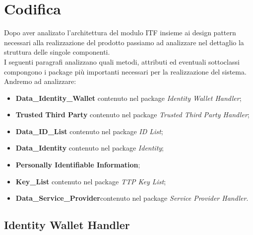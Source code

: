 
\chapter{Codifica}
\label{cap:codifica}
Dopo aver analizato l'architettura del modulo \gls{ITF} insieme ai design pattern necessari alla realizzazione del prodotto passiamo ad analizzare nel dettaglio la struttura delle singole componenti.\\
I seguenti paragrafi analizzano quali metodi, attributi ed eventuali sottoclassi compongono i package più importanti necessari per la realizzazione del sistema.\\
Andremo ad analizzare:
\begin{itemize}
	\item \textbf{Data\_Identity\_Wallet} contenuto nel package \textit{Identity Wallet Handler};
	\item \textbf{Trusted Third Party} contenuto nel package \textit{Trusted Third Party Handler};
	\item \textbf{Data\_ID\_List} contenuto nel package \textit{ID List};
	\item \textbf{Data\_Identity} contenuto nel package \textit{Identity};
	\item \textbf{Personally Identifiable Information};
	\item \textbf{Key\_List} contenuto nel package \textit{TTP Key List};
	\item \textbf{Data\_Service\_Provider}contenuto nel package \textit{Service Provider Handler}.
\end{itemize}
\newpage
\section{Identity Wallet Handler}
